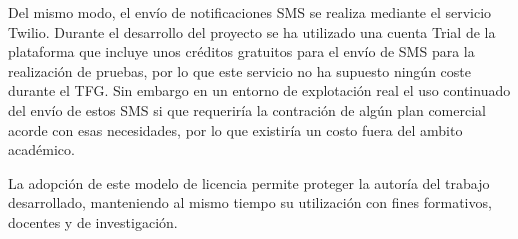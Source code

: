Del mismo modo, el envío de notificaciones SMS se realiza mediante el servicio Twilio. Durante el desarrollo del proyecto se ha utilizado una cuenta Trial de la plataforma que incluye unos créditos gratuitos para el envío de SMS para la realización de pruebas, por lo que este servicio no ha supuesto ningún coste durante el TFG. Sin embargo en un entorno de explotación real el uso continuado del envío de estos SMS si que requeriría la contración de algún plan comercial acorde con esas necesidades, por lo que existiría un costo fuera del ambito académico.

La adopción de este modelo de licencia permite proteger la autoría del trabajo desarrollado, manteniendo al mismo tiempo su utilización con fines formativos, docentes y de investigación.




